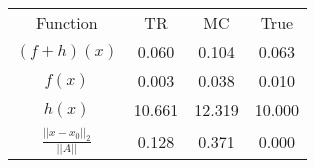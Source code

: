 \begin{tabular}{| c |c |c |c |}
    \hline
    \rowcolor[gray]{0.9}
\multicolumn{4}{|c|}{Minima} \\ \hline Function & TR & MC & True \\
    \hline
  \rowcolor[gray]{0.7}
    $ (f + h)(x) $ & 0.060 & 0.104 & 0.063 \\
  \hline
  \rowcolor[gray]{0.8}
    $ f(x) $ & 0.003 & 0.038 & 0.010 \\
  \hline
  \rowcolor[gray]{0.7}
    $ h(x) $ & 10.661 & 12.319 & 10.000 \\
  \hline
  \rowcolor[gray]{0.8}
    $ \frac{||x - x_0||_2}{||A||} $ & 0.128 & 0.371 & 0.000 \\
  \hline
\end{tabular}
